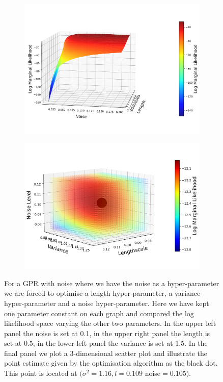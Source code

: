 \documentclass[11pt]{article}
\begin{document}
\begin{figure}[H]
    \begin{subfigure}[b]{0.4\textwidth}
        \centering
        \includegraphics[width=\textwidth]{LatexPlots/1dplots/lengthvsnoise.png}
    \end{subfigure}
    \hspace{0.05\textwidth}
    \begin{subfigure}[b]{0.4\textwidth}
        \centering
        \includegraphics[width=\textwidth]{LatexPlots/1dplots/LogLike3params.png}
    \end{subfigure}
    \caption{For a GPR with noise where we have the noise as a hyper-parameter we are forced to optimise a length hyper-parameter, a variance hyper-parameter and a noise hyper-parameter. 
    Here we have kept one parameter constant on each graph and compared the log likelihood space varying the other two parameters. 
    In the upper left panel the noise is set at 0.1, in the upper right panel the length is set at 0.5, in the lower left panel the variance is set at 1.5. 
    In the final panel we plot a 3-dimensional scatter plot and illustrate the point estimate given by the optimisation algorithm as the black dot. This point is located at
    $(\sigma^2 = 1.16, l = 0.109$ noise$ = 0.105)$.}
   \label{figure: Optimising Hyper-params}
\end{figure} 
\end{document}
